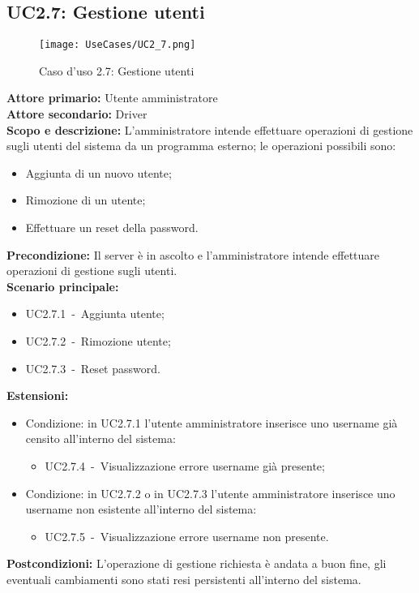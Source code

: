 \documentclass{scalatekids-article}
\begin{document}
\subsection{UC2.7: Gestione utenti}

\begin{figure}[H]
  \begin{center}
    \texttt{[image: UseCases/UC2\_7.png]}
    \caption*{Caso d'uso 2.7: Gestione utenti}
  \end{center}
\end{figure}

\textbf{Attore primario:} Utente amministratore\\
\textbf{Attore secondario:} Driver\\
\textbf{Scopo e descrizione:} L'amministratore intende effettuare operazioni di gestione sugli utenti del sistema da un programma  esterno; le operazioni possibili sono:
\begin{itemize}
\item Aggiunta di un nuovo utente;
\item Rimozione di un utente;
\item Effettuare un reset della password.
\end{itemize}
\textbf{Precondizione:} Il server è in ascolto e l'amministratore intende effettuare operazioni di gestione sugli utenti.\\
\textbf{Scenario principale:}
\begin{itemize}
\item UC2.7.1\ -\ Aggiunta utente;
\item UC2.7.2\ -\ Rimozione utente;
\item UC2.7.3\ -\ Reset password.
\end{itemize}
\textbf{Estensioni:}
\begin{itemize}
\item Condizione: in UC2.7.1 l'utente amministratore inserisce uno username già censito all'interno del sistema:
  \begin{itemize}
  \item UC2.7.4\ -\ Visualizzazione errore username già presente;
  \end{itemize}
\item Condizione: in UC2.7.2 o in UC2.7.3 l'utente amministratore inserisce uno username non esistente all'interno del sistema:
  \begin{itemize}
  \item UC2.7.5\ -\ Visualizzazione errore username non presente.
  \end{itemize}
\end{itemize}
\textbf{Postcondizioni:} L'operazione di gestione richiesta è andata a buon fine, gli eventuali cambiamenti sono stati resi persistenti all'interno del sistema.
\end{document}

